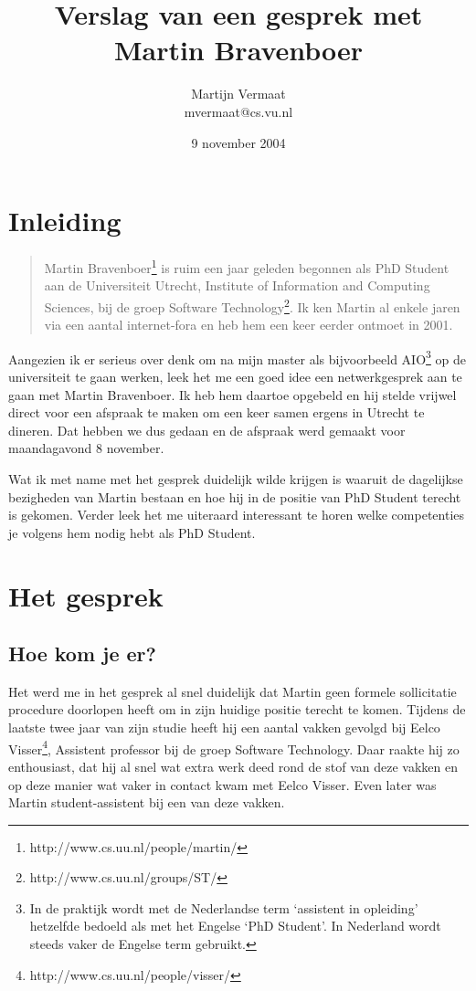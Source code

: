 \documentclass[a4paper,11pt]{article} %
\title{Verslag van een gesprek met Martin Bravenboer}
\author{
    Martijn Vermaat\\
    mvermaat@cs.vu.nl
}
\date{9 november 2004}
\begin{document}
\maketitle


\section*{Inleiding}

\begin{quote}
Martin Bravenboer\footnote{http://www.cs.uu.nl/people/martin/} is ruim een
jaar geleden begonnen als PhD Student aan de Universiteit Utrecht, Institute
of Information and Computing Sciences, bij de groep Software
Technology\footnote{http://www.cs.uu.nl/groups/ST/}. Ik ken Martin al enkele
jaren via een aantal internet-fora en heb hem een keer eerder ontmoet in
2001.
\end{quote}

Aangezien ik er serieus over denk om na mijn master als bijvoorbeeld
AIO\footnote{In de praktijk wordt met de Nederlandse term `assistent in
  opleiding' hetzelfde bedoeld als met het Engelse `PhD Student'. In Nederland
  wordt steeds vaker de Engelse term gebruikt.} op de universiteit te gaan
werken, leek het me een goed idee een netwerkgesprek aan te gaan met Martin
Bravenboer. Ik heb hem daartoe opgebeld en hij stelde vrijwel direct voor een
afspraak te maken om een keer samen ergens in Utrecht te dineren. Dat hebben
we dus gedaan en de afspraak werd gemaakt voor maandagavond 8 november.

Wat ik met name met het gesprek duidelijk wilde krijgen is waaruit de
dagelijkse bezigheden van Martin bestaan en hoe hij in de positie van PhD
Student terecht is gekomen. Verder leek het me uiteraard interessant te horen
welke competenties je volgens hem nodig hebt als PhD Student.


\section*{Het gesprek}


\subsection*{Hoe kom je er?}

Het werd me in het gesprek al snel duidelijk dat Martin geen formele
sollicitatie procedure doorlopen heeft om in zijn huidige positie terecht te
komen. Tijdens de laatste twee jaar van zijn studie heeft hij een aantal
vakken gevolgd bij Eelco Visser\footnote{http://www.cs.uu.nl/people/visser/},
Assistent professor bij de groep Software Technology. Daar raakte hij zo
enthousiast, dat hij al snel wat extra werk deed rond de stof van deze vakken
en op deze manier wat vaker in contact kwam met Eelco Visser. Even later was
Martin student-assistent bij een van deze vakken.
\end{document}
